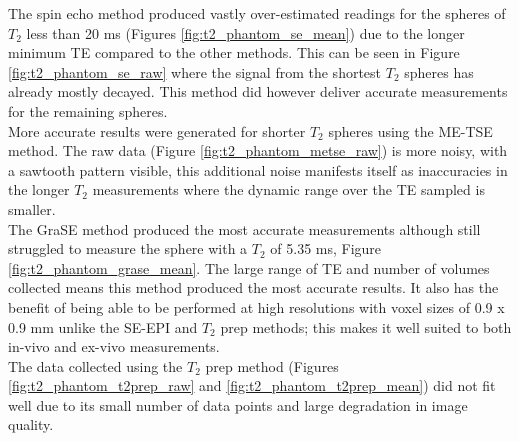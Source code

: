 The spin echo method produced vastly over-estimated readings for the spheres of $T_2$ less than 20 ms (Figures \ref{fig:t2_phantom_se_mean}) due to the longer minimum \ac{TE} compared to the other methods. This can be seen in Figure \ref{fig:t2_phantom_se_raw} where the signal from the shortest $T_2$ spheres has already mostly decayed. This method did however deliver accurate measurements for the remaining spheres.\\

More accurate results were generated for shorter $T_2$ spheres using the \ac{ME-TSE} method. The raw data (Figure \ref{fig:t2_phantom_metse_raw}) is more noisy, with a sawtooth pattern visible, this additional noise manifests itself as inaccuracies in the longer $T_2$ measurements where the dynamic range over the \ac{TE} sampled is smaller.\\

The \ac{GraSE} method produced the most accurate measurements although still struggled to measure the sphere with a $T_2$ of 5.35 ms, Figure \ref{fig:t2_phantom_grase_mean}. The large range of \ac{TE} and number of volumes collected means this method produced the most accurate results. It also has the benefit of being able to be performed at high resolutions with voxel sizes of 0.9 x 0.9 mm unlike the \ac{SE}-\ac{EPI} and $T_2$ prep methods; this makes it well suited to both in-vivo and ex-vivo measurements.\\

The data collected using the $T_2$ prep method (Figures \ref{fig:t2_phantom_t2prep_raw} and \ref{fig:t2_phantom_t2prep_mean}) did not fit well due to its small number of data points and large degradation in image quality.\\

